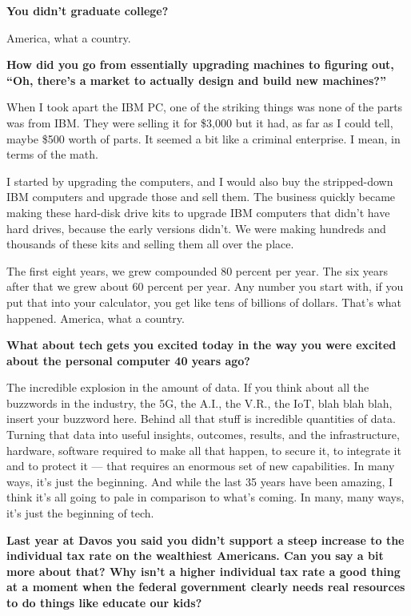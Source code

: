 \textbf{You didn't graduate college?}

America, what a country.

\textbf{How did you go from essentially upgrading machines to figuring
out, ``Oh, there's a market to actually design and build new
machines?''}

When I took apart the IBM PC, one of the striking things was none of the
parts was from IBM. They were selling it for \$3,000 but it had, as far
as I could tell, maybe \$500 worth of parts. It seemed a bit like a
criminal enterprise. I mean, in terms of the math.

I started by upgrading the computers, and I would also buy the
stripped-down IBM computers and upgrade those and sell them. The
business quickly became making these hard-disk drive kits to upgrade IBM
computers that didn't have hard drives, because the early versions
didn't. We were making hundreds and thousands of these kits and selling
them all over the place.

The first eight years, we grew compounded 80 percent per year. The six
years after that we grew about 60 percent per year. Any number you start
with, if you put that into your calculator, you get like tens of
billions of dollars. That's what happened. America, what a country.

\textbf{What about tech gets you excited today in the way you were
excited about the personal computer 40 years ago?}

The incredible explosion in the amount of data. If you think about all
the buzzwords in the industry, the 5G, the A.I., the V.R., the IoT, blah
blah blah, insert your buzzword here. Behind all that stuff is
incredible quantities of data. Turning that data into useful insights,
outcomes, results, and the infrastructure, hardware, software required
to make all that happen, to secure it, to integrate it and to protect it
--- that requires an enormous set of new capabilities. In many ways,
it's just the beginning. And while the last 35 years have been amazing,
I think it's all going to pale in comparison to what's coming. In many,
many ways, it's just the beginning of tech.

\textbf{Last year at Davos you said you didn't support a steep increase
to the individual tax rate on the wealthiest Americans. Can you say a
bit more about that? Why isn't a higher individual tax rate a good thing
at a moment when the federal government clearly needs real resources to
do things like educate our kids?}

